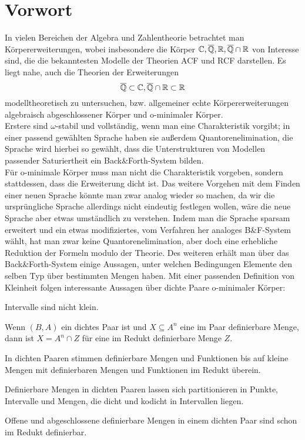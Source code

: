 \chapter*{Vorwort}
In vielen Bereichen der Algebra und Zahlentheorie betrachtet man Körpererweiterungen, wobei insbesondere die Körper $\mathbb{C},\overline{\mathbb{Q}},\mathbb{R},\overline{\mathbb{Q}}\cap\mathbb{R}$ von Interesse sind, die die bekanntesten Modelle der Theorien ACF und RCF darstellen. Es liegt nahe, auch die Theorien der Erweiterungen $$\overline{\mathbb{Q}}\subset\mathbb{C},\overline{\mathbb{Q}}\cap\mathbb{R}\subset\mathbb{R}$$ modelltheoretisch zu untersuchen, bzw. allgemeiner echte Körpererweiterungen algebraisch abgeschlossener Körper und o-minimaler Körper.\\
Erstere sind $\omega$-stabil und vollständig, wenn man eine Charakteristik vorgibt; in einer passend gewählten Sprache haben sie außerdem Quantorenelimination, die Sprache wird hierbei so gewählt, dass die Unterstrukturen von Modellen passender Saturiertheit ein Back\&Forth-System bilden.\\
Für o-minimale Körper muss man nicht die Charakteristik vorgeben, sondern stattdessen, dass die Erweiterung dicht ist. Das weitere Vorgehen mit dem Finden einer neuen Sprache könnte man zwar analog wieder so machen, da wir die ursprüngliche Sprache allerdings nicht eindeutig festlegen wollen, wäre die neue Sprache aber etwas umständlich zu verstehen. Indem man die Sprache sparsam erweitert und ein etwas modifiziertes, vom Verfahren her analoges B\&F-System wählt, hat man zwar keine Quantorenelimination, aber doch eine erhebliche Reduktion der Formeln modulo der Theorie. Des weiteren erhält man über das Back\&Forth-System einige Aussagen, unter welchen Bedingungen Elemente den selben Typ über bestimmten Mengen haben. Mit einer passenden Definition von Kleinheit folgen interessante Aussagen über dichte Paare o-minimaler Körper:
\begin{satzleer}
	Intervalle sind nicht klein.
\end{satzleer}

\begin{satzleer}
	Wenn $(B,A)$ ein dichtes Paar ist und $X\subseteq A^n$ eine im Paar definierbare Menge, dann ist $X=A^n\cap Z$ für eine im Redukt definierbare Menge $Z$.
\end{satzleer}

\begin{satzleer}
	In dichten Paaren stimmen definierbare Mengen und Funktionen bis auf kleine Mengen mit definierbaren Mengen und Funktionen im Redukt überein.
\end{satzleer}

\begin{satzleer}
	Definierbare Mengen in dichten Paaren lassen sich partitionieren in Punkte, Intervalle und Mengen, die dicht und kodicht in Intervallen liegen.
\end{satzleer}

\begin{satzleer}
	Offene und abgeschlossene definierbare Mengen in einem dichten Paar sind schon im Redukt definierbar.
\end{satzleer}